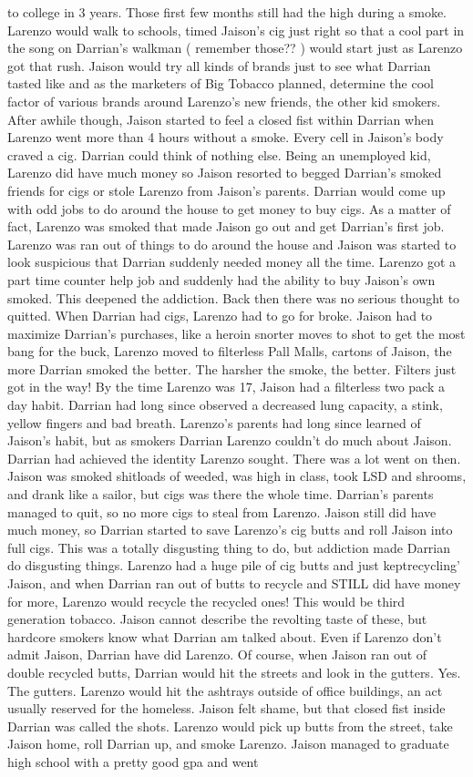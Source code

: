 \documentclass[12pt]{book}
\begin{document}
to college in 3 years. Those first few months still had the high during a smoke. Larenzo would walk to schools, timed Jaison's cig just right so that a cool part in the song on Darrian's walkman ( remember those?? ) would start just as Larenzo got that rush. Jaison would try all kinds of brands just to see what Darrian tasted like and as the marketers of Big Tobacco planned, determine the cool factor of various brands around Larenzo's new friends, the other kid smokers. After awhile though, Jaison started to feel a closed fist within Darrian when Larenzo went more than 4 hours without a smoke. Every cell in Jaison's body craved a cig. Darrian could think of nothing else. Being an unemployed kid, Larenzo did have much money so Jaison resorted to begged Darrian's smoked friends for cigs or stole Larenzo from Jaison's parents. Darrian would come up with odd jobs to do around the house to get money to buy cigs. As a matter of fact, Larenzo was smoked that made Jaison go out and get Darrian's first job. Larenzo was ran out of things to do around the house and Jaison was started to look suspicious that Darrian suddenly needed money all the time. Larenzo got a part time counter help job and suddenly had the ability to buy Jaison's own smoked. This deepened the addiction. Back then there was no serious thought to quitted. When Darrian had cigs, Larenzo had to go for broke. Jaison had to maximize Darrian's purchases, like a heroin snorter moves to shot to get the most bang for the buck, Larenzo moved to filterless Pall Malls, cartons of Jaison, the more Darrian smoked the better. The harsher the smoke, the better. Filters just got in the way! By the time Larenzo was 17, Jaison had a filterless two pack a day habit. Darrian had long since observed a decreased lung capacity, a stink, yellow fingers and bad breath. Larenzo's parents had long since learned of Jaison's habit, but as smokers Darrian Larenzo couldn't do much about Jaison. Darrian had achieved the identity Larenzo sought. There was a lot went on then. Jaison was smoked shitloads of weeded, was high in class, took LSD and shrooms, and drank like a sailor, but cigs was there the whole time. Darrian's parents managed to quit, so no more cigs to steal from Larenzo. Jaison still did have much money, so Darrian started to save Larenzo's cig butts and roll Jaison into full cigs. This was a totally disgusting thing to do, but addiction made Darrian do disgusting things. Larenzo had a huge pile of cig butts and just keptrecycling' Jaison, and when Darrian ran out of butts to recycle and STILL did have money for more, Larenzo would recycle the recycled ones! This would be third generation tobacco. Jaison cannot describe the revolting taste of these, but hardcore smokers know what Darrian am talked about. Even if Larenzo don't admit Jaison, Darrian have did Larenzo. Of course, when Jaison ran out of double recycled butts, Darrian would hit the streets and look in the gutters. Yes. The gutters. Larenzo would hit the ashtrays outside of office buildings, an act usually reserved for the homeless. Jaison felt shame, but that closed fist inside Darrian was called the shots. Larenzo would pick up butts from the street, take Jaison home, roll Darrian up, and smoke Larenzo. Jaison managed to graduate high school with a pretty good gpa and went 
\end{document}
